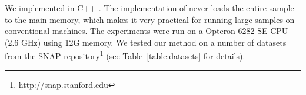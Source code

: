 \begin{table}[ht]
\centering
{}
\caption{The datasets and corresponding statistics.}\label{table:datasets}
\end{table}

 We implemented \algonameapx in C++
. The implementation of \algonameapx never loads the entire sample
to the main memory, which makes it very practical for running large samples on
conventional machines. The experiments were run on a Opteron 6282 SE CPU (2.6
GHz) using 12G memory. We tested our method on a number of datasets from the
SNAP repository\footnote{\url{http://snap.stanford.edu}} (see
Table~\ref{table:datasets} for details).

